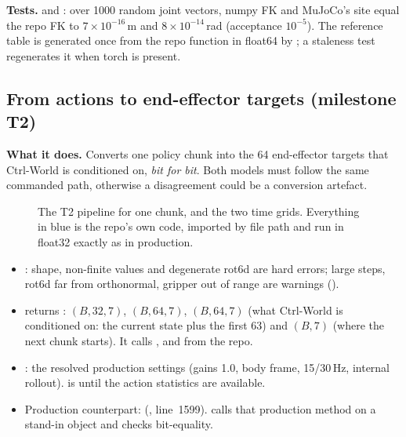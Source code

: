 \textbf{Tests.}  and : over 1000 random joint vectors, numpy FK and MuJoCo's  site equal the repo FK to $7\times10^{-16}$\,m and $8\times10^{-14}$\,rad (acceptance $10^{-5}$). The reference table is generated once from the repo function in float64 by ; a staleness test regenerates it when torch is present.

\subsection{From actions to end-effector targets (milestone T2) \done}\label{twin:sec:actions}
\textbf{What it does.} Converts one policy chunk into the 64 end-effector targets that Ctrl-World is conditioned on, \emph{bit for bit}. Both models must follow the same commanded path, otherwise a disagreement could be a conversion artefact.

\begin{figure}[h]
\centering

\caption{The T2 pipeline for one chunk, and the two time grids. Everything in blue is the repo's own code, imported by file path and run in float32 exactly as in production.}
\label{twin:fig:actions}
\end{figure}

\begin{incode}
\begin{itemize}[leftmargin=*]
\item {}: shape, non-finite values and degenerate rot6d are hard errors; large steps, rot6d far from orthonormal, gripper out of range are warnings ().
\item {} returns :  $(B,32,7)$,  $(B,64,7)$,  $(B,64,7)$ (what Ctrl-World is conditioned on: the current state plus the first 63) and  $(B,7)$ (where the next chunk starts). It calls ,  and  from the repo.
\item {}: the resolved production settings (gains 1.0, body frame, 15/30\,Hz, internal rollout).  is  until the action statistics are available.
\item Production counterpart:  (, line~1599).  calls that production method on a stand-in object and checks bit-equality.
\end{itemize}
\end{incode}

